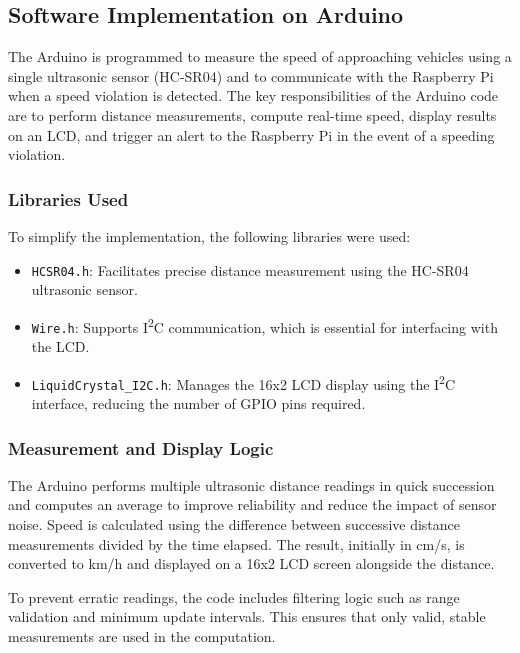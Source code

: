 \subsection*{Software Implementation on Arduino}

The Arduino is programmed to measure the speed of approaching vehicles using a single ultrasonic sensor (HC-SR04) and to communicate with the Raspberry Pi when a speed violation is detected. The key responsibilities of the Arduino code are to perform distance measurements, compute real-time speed, display results on an LCD, and trigger an alert to the Raspberry Pi in the event of a speeding violation.

\subsubsection*{Libraries Used}

To simplify the implementation, the following libraries were used:

\begin{itemize}
    \item \texttt{HCSR04.h}: Facilitates precise distance measurement using the HC-SR04 ultrasonic sensor.
    \item \texttt{Wire.h}: Supports I\textsuperscript{2}C communication, which is essential for interfacing with the LCD.
    \item \texttt{LiquidCrystal\_I2C.h}: Manages the 16x2 LCD display using the I\textsuperscript{2}C interface, reducing the number of GPIO pins required.
\end{itemize}

\subsubsection*{Measurement and Display Logic}

The Arduino performs multiple ultrasonic distance readings in quick succession and computes an average to improve reliability and reduce the impact of sensor noise. Speed is calculated using the difference between successive distance measurements divided by the time elapsed. The result, initially in cm/s, is converted to km/h and displayed on a 16x2 LCD screen alongside the distance.

To prevent erratic readings, the code includes filtering logic such as range validation and minimum update intervals. This ensures that only valid, stable measurements are used in the computation.

